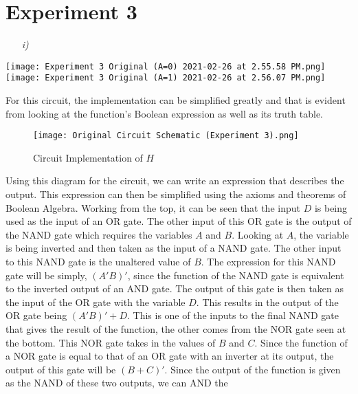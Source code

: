 \documentclass[12pt]{article}
\newcommand{\twoobjects}[2]{%
  \leavevmode\vbox{\hbox{#1}\nointerlineskip\hbox{#2}}%
}
\begin{document}
    \section*{Experiment 3}
    \begin{itemize}
        \item[\textit{i)}]
    \end{itemize}
    \begin{center}
        \twoobjects
            {\texttt{[image: Experiment 3 Original (A=0)
            2021-02-26 at 2.55.58 PM.png]}}
            {\texttt{[image: Experiment 3 Original (A=1)
            2021-02-26 at 2.56.07 PM.png]}}
    \end{center}
    \par For this circuit, the implementation can be simplified greatly and that
    is evident from looking at the function's Boolean expression as well as its
    truth table.
    \begin{figure}[h]
        \centering
        \texttt{[image: Original Circuit Schematic
        (Experiment 3).png]}
        \caption{Circuit Implementation of $H$}%
    \end{figure}
    \par Using this diagram for the circuit, we can write an expression that
    describes the output. This expression can then be simplified using the
    axioms and theorems of Boolean Algebra. Working from the top, it can be seen
    that the input $D$ is being used as the input of an OR gate. The other input
    of this OR gate is the output of the NAND gate which requires the variables
    $A$ and $B$. Looking at $A$, the variable is being inverted and then taken
    as the input of a NAND gate. The other input to this NAND gate is the
    unaltered value of $B$. The expression for this NAND gate will be simply,
    $(A'B)'$, since the function of the NAND gate is equivalent to the inverted
    output of an AND gate. The output of this gate is then taken as the input of
    the OR gate with the variable $D$. This results in the output of the OR gate
    being $(A'B)'+D$. This is one of the inputs to the final NAND gate that
    gives the result of the function, the other comes from the NOR gate seen at
    the bottom. This NOR gate takes in the values of $B$ and $C$. Since the
    function of a NOR gate is equal to that of an OR gate with an inverter at
    its output, the output of this gate will be $(B+C)'$.  Since the output of
    the function is given as the NAND of these two outputs, we can AND the
\end{document}
